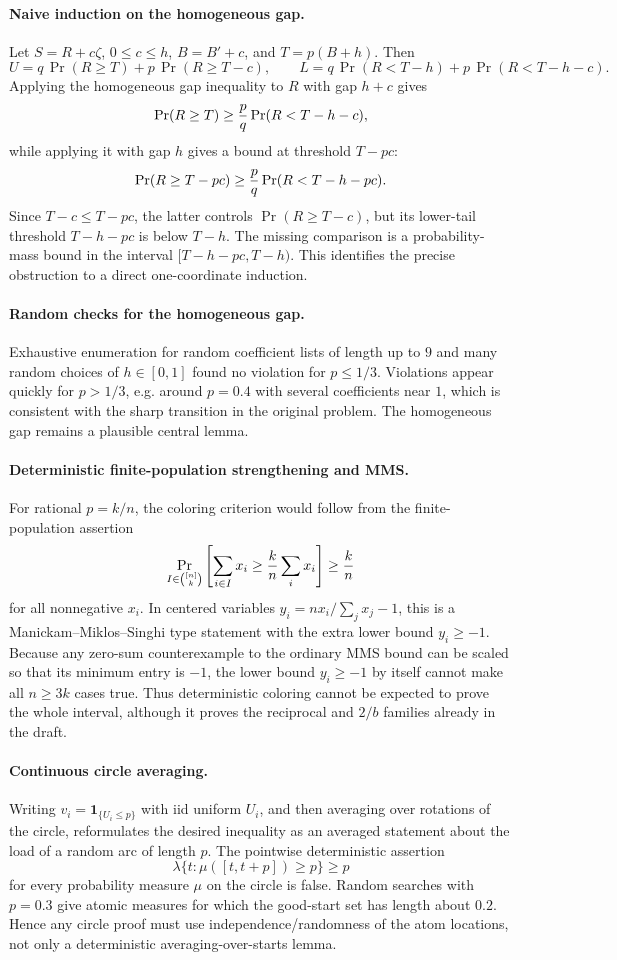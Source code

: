 \documentclass[12pt]{article}
\begin{document}
\paragraph{Naive induction on the homogeneous gap.}
Let \(S=R+c\zeta\), \(0\le c\le h\), \(B=B'+c\), and
\(T=p(B+h)\).  Then
\[
 U=q\,\Pr(R\ge T)+p\,\Pr(R\ge T-c),\qquad
 L=q\,\Pr(R<T-h)+p\,\Pr(R<T-h-c).
\]
Applying the homogeneous gap inequality to \(R\) with gap \(h+c\) gives
\[
 \Pr(R\ge T)\ge {p\over q}\Pr(R<T-h-c),
\]
while applying it with gap \(h\) gives a bound at threshold \(T-pc\):
\[
 \Pr(R\ge T-pc)\ge {p\over q}\Pr(R<T-h-pc).
\]
Since \(T-c\le T-pc\), the latter controls
\(\Pr(R\ge T-c)\), but its lower-tail threshold \(T-h-pc\) is below
\(T-h\).  The missing comparison is a probability-mass bound in the interval
\([T-h-pc,T-h)\).  This identifies the precise obstruction to a direct
one-coordinate induction.

\paragraph{Random checks for the homogeneous gap.}
Exhaustive enumeration for random coefficient lists of length up to \(9\) and
many random choices of \(h\in[0,1]\) found no violation for
\(p\le1/3\).  Violations appear quickly for \(p>1/3\), e.g. around \(p=0.4\)
with several coefficients near \(1\), which is consistent with the sharp
transition in the original problem.  The homogeneous gap remains a plausible
central lemma.

\paragraph{Deterministic finite-population strengthening and MMS.}
For rational \(p=k/n\), the coloring criterion would follow from the
finite-population assertion
\[
 \Pr_{I\in\binom{[n]}k}\left[\sum_{i\in I}x_i\ge {k\over n}\sum_i x_i\right]
 \ge {k\over n}
\]
for all nonnegative \(x_i\).  In centered variables
\(y_i=nx_i/\sum_jx_j-1\), this is a Manickam--Miklos--Singhi type statement
with the extra lower bound \(y_i\ge-1\).  Because any zero-sum counterexample
to the ordinary MMS bound can be scaled so that its minimum entry is \(-1\),
the lower bound \(y_i\ge-1\) by itself cannot make all \(n\ge3k\) cases true.
Thus deterministic coloring cannot be expected to prove the whole interval,
although it proves the reciprocal and \(2/b\) families already in the draft.

\paragraph{Continuous circle averaging.}
Writing \(v_i=\mathbf1_{\{U_i\le p\}}\) with iid uniform \(U_i\), and then
averaging over rotations of the circle, reformulates the desired inequality as
an averaged statement about the load of a random arc of length \(p\).  The
pointwise deterministic assertion
\[
 \lambda\{t:\mu([t,t+p])\ge p\}\ge p
\]
for every probability measure \(\mu\) on the circle is false.  Random searches
with \(p=0.3\) give atomic measures for which the good-start set has length
about \(0.2\).  Hence any circle proof must use independence/randomness of the
atom locations, not only a deterministic averaging-over-starts lemma.
\end{document}
